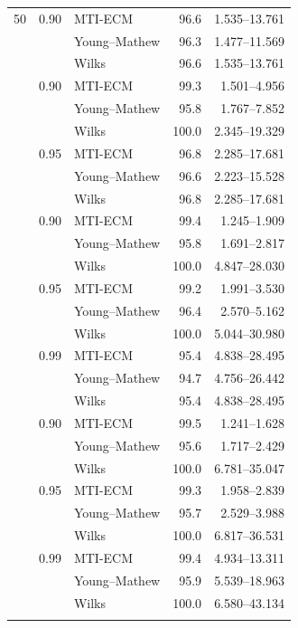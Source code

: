 \begin{longtable}{@{}rrlrr@{}}
50 & 0.90 & MTI-ECM & 96.6 & 1.535--13.761 \\
 &  & Young--Mathew & 96.3 & 1.477--11.569 \\
 &  & Wilks & 96.6 & 1.535--13.761 \\
\addlinespace[0.25em]
100 & 0.90 & MTI-ECM & 99.3 & 1.501--4.956 \\
 &  & Young--Mathew & 95.8 & 1.767--7.852 \\
 &  & Wilks & 100.0 & 2.345--19.329 \\
\addlinespace[0.25em]
100 & 0.95 & MTI-ECM & 96.8 & 2.285--17.681 \\
 &  & Young--Mathew & 96.6 & 2.223--15.528 \\
 &  & Wilks & 96.8 & 2.285--17.681 \\
\addlinespace[0.25em]
500 & 0.90 & MTI-ECM & 99.4 & 1.245--1.909 \\
 &  & Young--Mathew & 95.8 & 1.691--2.817 \\
 &  & Wilks & 100.0 & 4.847--28.030 \\
\addlinespace[0.25em]
500 & 0.95 & MTI-ECM & 99.2 & 1.991--3.530 \\
 &  & Young--Mathew & 96.4 & 2.570--5.162 \\
 &  & Wilks & 100.0 & 5.044--30.980 \\
\addlinespace[0.25em]
500 & 0.99 & MTI-ECM & 95.4 & 4.838--28.495 \\
 &  & Young--Mathew & 94.7 & 4.756--26.442 \\
 &  & Wilks & 95.4 & 4.838--28.495 \\
\addlinespace[0.25em]
1000 & 0.90 & MTI-ECM & 99.5 & 1.241--1.628 \\
 &  & Young--Mathew & 95.6 & 1.717--2.429 \\
 &  & Wilks & 100.0 & 6.781--35.047 \\
\addlinespace[0.25em]
1000 & 0.95 & MTI-ECM & 99.3 & 1.958--2.839 \\
 &  & Young--Mathew & 95.7 & 2.529--3.988 \\
 &  & Wilks & 100.0 & 6.817--36.531 \\
\addlinespace[0.25em]
1000 & 0.99 & MTI-ECM & 99.4 & 4.934--13.311 \\
 &  & Young--Mathew & 95.9 & 5.539--18.963 \\
 &  & Wilks & 100.0 & 6.580--43.134 \\
\addlinespace[0.25em]
\bottomrule
\end{longtable}
\endgroup
